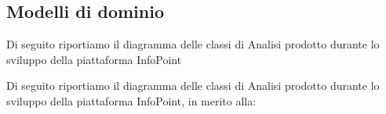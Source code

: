     \subsection{Modelli di dominio}
      \begin{center}

            Di seguito riportiamo il diagramma delle classi di Analisi prodotto durante lo sviluppo della piattaforma InfoPoint
      \end{center}

      \begin{center}

            Di seguito riportiamo il diagramma delle classi di Analisi prodotto durante lo sviluppo della piattaforma InfoPoint, in merito alla:
      \end{center}
    \newpage
